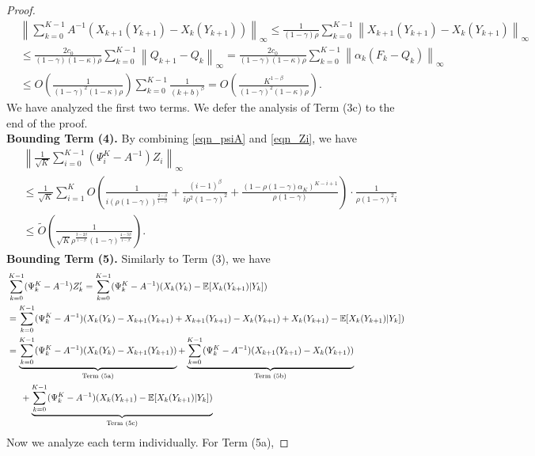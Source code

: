 \documentclass{opt2025} %
\begin{document}
\begin{proof}
\begin{align*}
&\left\| \sum_{k=0}^{K-1} A^{-1} ( X_{k+1}(Y_{k+1})  - X_{k}(Y_{k+1})) \right\|_{\infty} \leq \frac{1}{(1-\gamma)\rho}\sum_{k=0}^{K-1}  \left\|  X_{k+1}(Y_{k+1})  - X_{k}(Y_{k+1})\right\|_{\infty}\\
&\leq \frac{2c_0}{(1-\gamma)(1-\kappa)\rho}\sum_{k=0}^{K-1}  \left\|  Q_{k+1}  - Q_{k}\right\|_{\infty} = \frac{2c_0}{(1-\gamma)(1-\kappa)\rho}\sum_{k=0}^{K-1}  \left\| \alpha_{k}( F_k - Q_k) \right\|_{\infty}\\
&\leq O\left(\frac{1}{(1-\gamma)^2(1-\kappa)\rho}\right) \sum_{k=0}^{K-1} \frac{1}{(k+b)^{\beta}} =  O\left(\frac{K^{1-\beta}}{(1-\gamma)^2(1-\kappa)\rho}\right).
\end{align*}
We have analyzed the first two terms. We defer the analysis of Term (3c) to the end of the proof.\\
\textbf{Bounding Term (4).} By combining \cref{eqn_psiA} and \cref{eqn_Zi}, we have
\begin{align*}
&\left\| \frac{1}{\sqrt{K}} \sum_{i=0}^{K-1} (\Psi_i^K- A^{-1}) Z_i \right\|_{\infty} \\
&\leq \frac{1}{\sqrt{K}}\sum_{i=1}^{K} O\left( \frac{1}{i(\rho(1-\gamma))^{\frac{2-\beta}{1-\beta}}}  + \frac{(i-1)^{\beta}}{i\rho^2(1-\gamma)^2} + \frac{(1-\rho(1-\gamma)\alpha_K)^{K-i+1}}{\rho(1-\gamma)}  \right)\cdot \frac{1}{\rho (1-\gamma)^2i}\\
&\leq \tilde{O}\left( \frac{1}{\sqrt{K} \rho^{\frac{3-2\beta}{1-\beta}}(1-\gamma)^{\frac{4-3\beta}{1-\beta}}} \right).
\end{align*}
\textbf{Bounding Term (5).} 
Similarly to Term (3), we have
\begin{align*}
&\sum_{k=0}^{K-1} (\Psi_k^K- A^{-1}) Z_k^{\prime} = \sum_{k=0}^{K-1} (\Psi_k^K- A^{-1}) (X_k(Y_k) - \mathbb{E}[X_k(Y_{k+1})| Y_{k}])\\
&=\sum_{k=0}^{K-1} (\Psi_k^K- A^{-1}) (X_k(Y_{k}) - X_{k+1}(Y_{k+1}) + X_{k+1}(Y_{k+1})  - X_{k}(Y_{k+1}) + X_{k}(Y_{k+1}) - \mathbb{E}[X_k(Y_{k+1})| Y_{k}])\\
&= \underbrace{\sum_{k=0}^{K-1} (\Psi_k^K- A^{-1}) (X_k(Y_{k}) - X_{k+1}(Y_{k+1}))}_{\text{Term (5a)}} + \underbrace{\sum_{k=0}^{K-1} (\Psi_k^K- A^{-1})( X_{k+1}(Y_{k+1})  - X_{k}(Y_{k+1}))}_{\text{Term (5b)}}\\
&\indent + \underbrace{\sum_{k=0}^{K-1} (\Psi_k^K- A^{-1})( X_{k}(Y_{k+1}) - \mathbb{E}[X_k(Y_{k+1})| Y_{k}])}_{\text{Term (5c)}}
\end{align*}
Now we analyze each term individually. For Term (5a), 

\end{proof}
\end{document}
